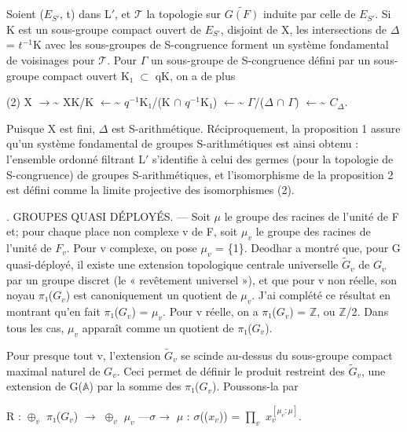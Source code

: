 \documentclass[10pt,a4paper]{article}
\begin{document}
\smallskip
\noindent Soient (\ensuremath{E_{S′}}, t) dans L\ensuremath{′}, et \ensuremath{𝒯} la topologie sur \ensuremath{\widetilde{G(F)}} induite par celle de \ensuremath{E_{S′}}. Si K est un sous-groupe compact ouvert de \ensuremath{E_{S′}}, disjoint de X, les intersections de \ensuremath{Δ} = \ensuremath{t^{-1}}K avec les sous-groupes de S-congruence forment un système fondamental de voisinages pour \ensuremath{𝒯}. Pour \ensuremath{Γ} un sous-groupe de S-congruence défini par un sous-groupe compact ouvert K\ensuremath{₁} \ensuremath{⊂} qK, on a de plus\par
\smallskip
\noindent (2)    X  \ensuremath{→}\textasciitilde{}  XK/K  \ensuremath{←}\textasciitilde{}  \ensuremath{q^{-1}}K\ensuremath{₁}/(K \ensuremath{∩} \ensuremath{q^{-1}}K\ensuremath{₁})  \ensuremath{←}\textasciitilde{}  \ensuremath{Γ}/(\ensuremath{Δ} \ensuremath{∩} \ensuremath{Γ})  \ensuremath{←}\textasciitilde{}  \ensuremath{C_Δ}.\par
\smallskip
\noindent Puisque X est fini, \ensuremath{Δ} est S-arithmétique. Réciproquement, la proposition 1 assure qu'un système fondamental de groupes S-arithmétiques est ainsi obtenu : l'ensemble ordonné filtrant L\ensuremath{′} s'identifie à celui des germes (pour la topologie de S-congruence) de groupes S-arithmétiques, et l'isomorphisme de la proposition 2 est défini comme la limite projective des isomorphismes (2).\par
\smallskip
{}. GROUPES QUASI DÉPLOYÉS. — Soit \ensuremath{μ} le groupe des racines de l'unité de F et; pour chaque place non complexe v de F, soit \ensuremath{μ_v} le groupe des racines de l'unité de \ensuremath{F_v}. Pour v complexe, on pose \ensuremath{μ_v} = \{1\}. Deodhar a montré que, pour G quasi-déployé, il existe une extension topologique centrale universelle \ensuremath{\widetilde{G}_v} de \ensuremath{G_v} par un groupe discret (le « revêtement universel »), et que pour v non réelle, son noyau \ensuremath{π₁}(\ensuremath{G_v}) est canoniquement un quotient de \ensuremath{μ_v}. J'ai complété ce résultat en montrant qu'en fait \ensuremath{π₁}(\ensuremath{G_v}) = \ensuremath{μ_v}. Pour v réelle, on a \ensuremath{π₁}(\ensuremath{G_v}) = \ensuremath{ℤ}, ou \ensuremath{ℤ}/2. Dans tous les cas, \ensuremath{μ_v} apparaît comme un quotient de \ensuremath{π₁}(\ensuremath{G_v}).\par
\smallskip
\noindent Pour presque tout v, l'extension \ensuremath{\widetilde{G}_v} se scinde au-dessus du sous-groupe compact maximal naturel de \ensuremath{G_v}. Ceci permet de définir le produit restreint des \ensuremath{\widetilde{G}_v}, une extension de G(\ensuremath{𝔸}) par la somme des \ensuremath{π₁}(\ensuremath{G_v}). Poussons-la par\par
\smallskip
\noindent R : \ensuremath{⊕_v} \ensuremath{π₁}(\ensuremath{G_v}) \ensuremath{→} \ensuremath{⊕_v} \ensuremath{μ_v} —\ensuremath{σ→} \ensuremath{μ} : \ensuremath{σ}((\ensuremath{x_v})) = \ensuremath{∏_v} \ensuremath{x_v^{[μ_v:μ]}}.\par
\clearpage
{}\hypertarget{authority-page-0004}{}
\end{document}

